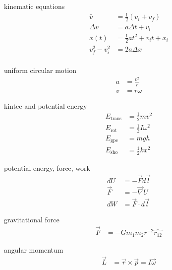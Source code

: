 \documentclass[avery5388, frame, grid]{flashcards}
\begin{document}
\begin{flashcard}{kinematic equations}
  {\begin{align*}
    \bar{v} &= \frac{1}{2} (v_{i} + v_{f})\\
    \Delta v &= a \Delta t + v_{i}\\
    x(t) &= \frac{1}{2} a t^{2} + v_{i} t + x_{i}\\
    v_{f}^{2} - v_{i}^{2} &= 2 a \Delta x\\
  \end{align*}}
\end{flashcard}

\begin{flashcard}{uniform circular motion}
  {\begin{align*}
      a &= \frac{v^{2}}{r}\\
      v &= r \omega
  \end{align*}}
\end{flashcard}

\begin{flashcard}{kintec and potential energy}
  {
    \begin{align*}
      E_{\textrm{trans}} &= \frac{1}{2} m v^{2}\\
      E_{\textrm{rot}} &= \frac{1}{2} I \omega^{2}\\
      E_{\textrm{gpe}} &= m g h\\
      E_{\textrm{sho}} &= \frac{1}{2} k x^{2}
    \end{align*}
  }
\end{flashcard}

\begin{flashcard}{potential energy, force, work}
  {
    \begin{align*}
       dU &= -\vec{F} d\vec{l}\\
      \vec{F} &= - \vec{\nabla} U\\
      dW &= \vec{F} \cdot d\vec{l}
    \end{align*}
  }
\end{flashcard}

\begin{flashcard}{gravitational force}
  {
    \begin{align*}
      \vec{F} &= - G m_{1} m_{2} r^{-2} \hat{r_{12}}
    \end{align*}
  }
\end{flashcard}

\begin{flashcard}{angular momentum}
  {
    \begin{align*}
      \vec{L} &= \vec{r} \times \vec{p} = I \vec{\omega}
    \end{align*}
  }
\end{flashcard}
\end{document}
